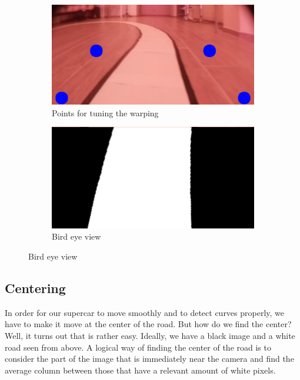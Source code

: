 \documentclass[12pt,a4paper]{article}
\begin{document}
\begin{large}
\begin{figure} [!hbp]
\begin{subfigure}[b]{0.3\textwidth}
    \end{subfigure}
    \hspace{0.1cm}
    \begin{subfigure}[b]{0.3\textwidth}
    \centering
    \captionsetup{justification=centering}
      \includegraphics[width=\textwidth]{images/points_warp.png}
      \caption{Points for tuning the warping \\}
      
    \end{subfigure}
    \hspace{0.1cm}
    \begin{subfigure}[b]{0.3\textwidth}
    \centering
    \captionsetup{justification=centering}
      \includegraphics[width=\textwidth]{images/birds_eye_view.png}
      \caption{Bird eye view \\}
      
    \end{subfigure}
  \end{figure}

\subsection{Centering}
In order for our supercar to move smoothly and to detect curves properly, we have to make it move at the center of the road. But how do we find the center? \\
Well, it turns out that is rather easy. Ideally, we have a black image and a white road seen from above. A logical way of finding the center of the road is to consider the part of the image that is immediately near the camera and find the average column between those that have a relevant amount of white pixels.


\end{large}
\end{document}
